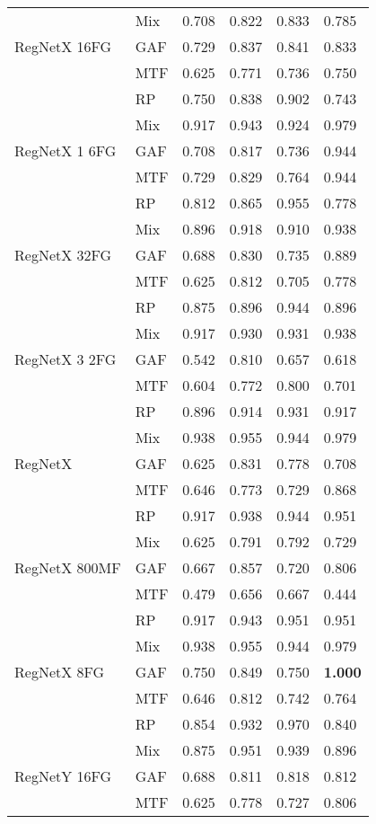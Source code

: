 \begin{longtable}[t]{llllll}
 & Mix & 0.708 & 0.822 & 0.833 & 0.785 \\
RegNetX 16FG & GAF & 0.729 & 0.837 & 0.841 & 0.833 \\
 & MTF & 0.625 & 0.771 & 0.736 & 0.750 \\
 & RP & 0.750 & 0.838 & 0.902 & 0.743 \\
 & Mix & 0.917 & 0.943 & 0.924 & 0.979 \\
RegNetX 1 6FG & GAF & 0.708 & 0.817 & 0.736 & 0.944 \\
 & MTF & 0.729 & 0.829 & 0.764 & 0.944 \\
 & RP & 0.812 & 0.865 & 0.955 & 0.778 \\
 & Mix & 0.896 & 0.918 & 0.910 & 0.938 \\
RegNetX 32FG & GAF & 0.688 & 0.830 & 0.735 & 0.889 \\
 & MTF & 0.625 & 0.812 & 0.705 & 0.778 \\
 & RP & 0.875 & 0.896 & 0.944 & 0.896 \\
 & Mix & 0.917 & 0.930 & 0.931 & 0.938 \\
RegNetX 3 2FG & GAF & 0.542 & 0.810 & 0.657 & 0.618 \\
 & MTF & 0.604 & 0.772 & 0.800 & 0.701 \\
 & RP & 0.896 & 0.914 & 0.931 & 0.917 \\
 & Mix & 0.938 & 0.955 & 0.944 & 0.979 \\
RegNetX & GAF & 0.625 & 0.831 & 0.778 & 0.708 \\
 & MTF & 0.646 & 0.773 & 0.729 & 0.868 \\
 & RP & 0.917 & 0.938 & 0.944 & 0.951 \\
 & Mix & 0.625 & 0.791 & 0.792 & 0.729 \\
RegNetX 800MF & GAF & 0.667 & 0.857 & 0.720 & 0.806 \\
 & MTF & 0.479 & 0.656 & 0.667 & 0.444 \\
 & RP & 0.917 & 0.943 & 0.951 & 0.951 \\
 & Mix & 0.938 & 0.955 & 0.944 & 0.979 \\
RegNetX 8FG & GAF & 0.750 & 0.849 & 0.750 & \textbf{1.000} \\
 & MTF & 0.646 & 0.812 & 0.742 & 0.764 \\
 & RP & 0.854 & 0.932 & 0.970 & 0.840 \\
 & Mix & 0.875 & 0.951 & 0.939 & 0.896 \\
RegNetY 16FG & GAF & 0.688 & 0.811 & 0.818 & 0.812 \\
 & MTF & 0.625 & 0.778 & 0.727 & 0.806 \\

\end{longtable}
